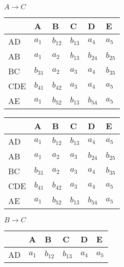 \documentclass[10pt, a4paper]{article}
\begin{document}
\begin{enumerate}
\begin{enumerate}
\begin{figure}[H]
\begin{minipage}[b]{0.5\linewidth}
						\caption{$A\to C$}\label{tab:2}
				\end{minipage}
			\end{figure}
			\begin{figure}[H]
				\begin{minipage}[b]{0.5\linewidth}
					\centering
					\begin{tabular}{|l|l|l|l|l|l|}
						\hline
							& A & B & C & D & E \\ \hline
						AD  & $a_1$ & $b_{12}$ & $b_{13}$  & $a_4$  & $a_5$  \\ \hline
						AB  & $a_1$ & $a_2$  & $b_{13}$  & $b_{24}$ & $b_{25}$  \\ \hline
						BC  & $b_{31}$ &  $a_2$ & $a_3$ & $a_4$ & $b_{35}$ \\ \hline
						CDE & $b_{41}$ & $b_{42}$ & $a_3$ & $a_4$ & $a_5$ \\ \hline
						AE  & $a_1$ & $b_{52}$ & $b_{13}$ & $b_{54}$ & $a_5$ \\ \hline
						\end{tabular}
						\caption{$C\to D$}\label{tab:3}
				\end{minipage}
				\begin{minipage}[b]{0.5\linewidth}
					\centering
					\begin{tabular}{|l|l|l|l|l|l|}
						\hline
							& A & B & C & D & E \\ \hline
						AD  & $a_1$ & $b_{12}$ & $b_{13}$  & $a_4$  & $a_5$  \\ \hline
						AB  & $a_1$ & $a_2$  & $a_3$  & $b_{24}$ & $b_{25}$  \\ \hline
						BC  & $b_{31}$ &  $a_2$ & $a_3$ & $a_4$ & $b_{35}$ \\ \hline
						CDE & $b_{41}$ & $b_{42}$ & $a_3$ & $a_4$ & $a_5$ \\ \hline
						AE  & $a_1$ & $b_{52}$ & $b_{13}$ & $b_{54}$ & $a_5$ \\ \hline
						\end{tabular}
						\caption{$B\to C$}\label{tab:4}
				\end{minipage}
			\end{figure}
			\begin{figure}[H]
				\begin{minipage}[b]{0.5\linewidth}
					\centering
					\begin{tabular}{|l|l|l|l|l|l|}
						\hline
							& A & B & C & D & E \\ \hline
						AD  & $a_1$ & $b_{12}$ & $b_{13}$  & $a_4$  & $a_5$  \\ \hline

\end{tabular}
\end{minipage}
\end{figure}
\end{enumerate}
\end{enumerate}
\end{document}

